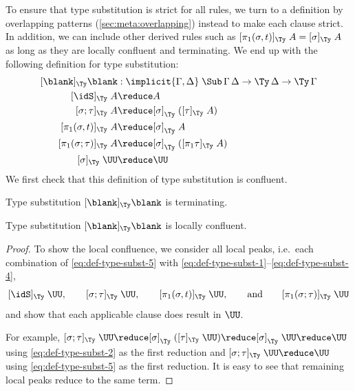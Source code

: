 \documentclass[a4paper,UKenglish,numberwithinsect,cleveref,thm-restate]{lipics-v2021}
\newcommand{\danger}{\marginpar[\hfill\dbend]{\dbend\hfill}}
\begin{document}
To ensure that type substitution is strict for all %
{rules}, we turn to a definition by overlapping patterns (\cref{sec:meta:overlapping}) instead to make each clause strict. 
In addition, we can include other derived rules such as $[\pi_1(\sigma, t)]_{\Ty}\;A = [ \sigma]_{\Ty}\;A$ as long as they are locally confluent and terminating.
We end up with the following definition for type substitution:
\begin{alignat}{3}
[\blank]_{\Ty} \blank            &: \implicit{\Gamma, \Delta} \; \Sub\,\Gamma\,\Delta \to \Ty\,\Delta \to \Ty\,\Gamma \nonumber \\
[ \idS ]_{\Ty}\;A                & \reduce A \label{eq:def-type-subst-1}\\
[ \sigma ; \tau ]_{\Ty}\;A       & \reduce [ \sigma ]_{\Ty}\;([ \tau ]_{\Ty}\;A) \label{eq:def-type-subst-2}\\
[ \pi_1(\sigma, t) ]_{\Ty}\;A    & \reduce [\sigma]_\Ty\;A                       \label{eq:def-type-subst-3} \\
[ \pi_1(\sigma; \tau) ]_{\Ty}\;A & \reduce [\sigma]_\Ty\;([\pi_1\tau]_\Ty\;A)    \label{eq:def-type-subst-4} \\
[ \sigma ]_{\Ty}\;\UU            & \reduce \UU                                   \label{eq:def-type-subst-5}
\end{alignat}
We first check that this definition of type substitution is confluent.
\begin{proposition}[Termination]
  Type substitution $[\blank]_{\Ty}\blank$ is terminating.
  \danger
\end{proposition}
\begin{proposition} \label{prop:local-confluence-1}
  Type substitution $[\blank]_{\Ty}\blank$ is locally confluent.
  \danger
\end{proposition}
\begin{proof}
  To show the local confluence, we consider all local peaks, i.e.\ each combination of \eqref{eq:def-type-subst-5} with \eqref{eq:def-type-subst-1}--\eqref{eq:def-type-subst-4},
  \[
    [\idS]_{\Ty}\;\UU, \qquad [\sigma;\tau]_{\Ty}\;\UU, \qquad [\pi_1(\sigma, t)]_{\Ty}\;\UU, \qquad\text{and}\qquad [\pi_1(\sigma; \tau)]_{\Ty}\;\UU
  \]
  and show that each applicable clause does result in $\UU$.

  For example, $[\sigma;\tau]_{\Ty}\;\UU \reduce [\sigma]_{\Ty}\;([\tau]_{\Ty}\;\UU) \reduce [\sigma]_{\Ty}\;\UU \reduce \UU$ using \eqref{eq:def-type-subst-2} as the first reduction and $[\sigma;\tau]_{\Ty}\;\UU \reduce \UU$ using \eqref{eq:def-type-subst-5} as the first reduction.
  It is easy to see that remaining local peaks reduce to the same term.
\end{proof}
\end{document}
